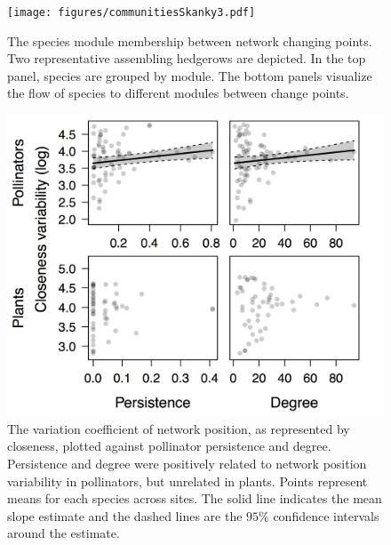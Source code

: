 \documentclass[12pt]{article}
\begin{document}
\begin{figure}
  \centering
  \texttt{[image: figures/communitiesSkanky3.pdf]}
  \caption{The species module membership between network changing
    points. Two representative assembling hedgerows are depicted. In
    the top panel, species are grouped by module. The bottom panels
    visualize the flow of species to different modules between change
    points. }
  \label{fig:changePoints2}
\end{figure}
\clearpage

\begin{figure}
  \centering
  \includegraphics[width=.8\textwidth]{figures/occ_degree.jpeg}
  \caption{The variation coefficient of network position, as
    represented by closeness, plotted against pollinator persistence
    and degree. Persistence and degree were positively related to
    network position variability in pollinators, but unrelated in
    plants. Points represent means for each species across sites. The
    solid line indicates the mean slope estimate and the dashed lines
    are the $95\%$ confidence intervals around the estimate. }
  \label{fig:cv}
\end{figure}
\clearpage
\end{document}
